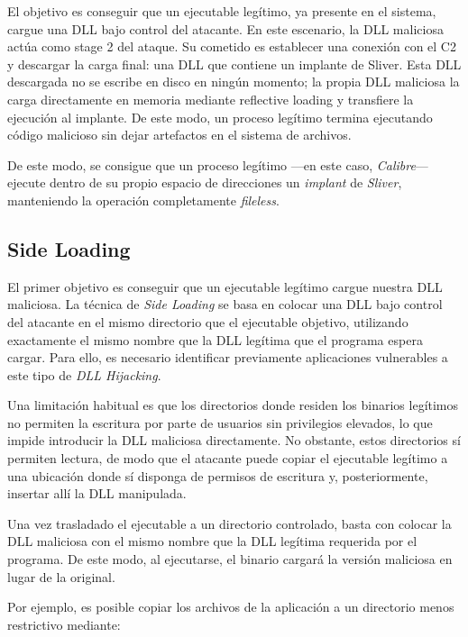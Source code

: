 El objetivo es conseguir que un ejecutable legítimo, ya presente en el sistema, cargue una DLL bajo control del atacante. En este escenario, la DLL maliciosa actúa como stage 2 del ataque. Su cometido es establecer una conexión con el C2 y descargar la carga final: una DLL que contiene un implante de Sliver. Esta DLL descargada no se escribe en disco en ningún momento; la propia DLL maliciosa la carga directamente en memoria mediante reflective loading y transfiere la ejecución al implante. De este modo, un proceso legítimo termina ejecutando código malicioso sin dejar artefactos en el sistema de archivos.

De este modo, se consigue que un proceso legítimo —en este caso, \textit{Calibre}— ejecute dentro de su propio espacio de direcciones un \textit{implant} de \textit{Sliver}, manteniendo la operación completamente \textit{fileless}.

\subsection{Side Loading}

El primer objetivo es conseguir que un ejecutable legítimo cargue nuestra DLL maliciosa. La técnica de \textit{Side Loading} se basa en colocar una DLL bajo control del atacante en el mismo directorio que el ejecutable objetivo, utilizando exactamente el mismo nombre que la DLL legítima que el programa espera cargar. Para ello, es necesario identificar previamente aplicaciones vulnerables a este tipo de \textit{DLL Hijacking}.

Una limitación habitual es que los directorios donde residen los binarios legítimos no permiten la escritura por parte de usuarios sin privilegios elevados, lo que impide introducir la DLL maliciosa directamente. No obstante, estos directorios sí permiten lectura, de modo que el atacante puede copiar el ejecutable legítimo a una ubicación donde sí disponga de permisos de escritura y, posteriormente, insertar allí la DLL manipulada.

Una vez trasladado el ejecutable a un directorio controlado, basta con colocar la DLL maliciosa con el mismo nombre que la DLL legítima requerida por el programa. De este modo, al ejecutarse, el binario cargará la versión maliciosa en lugar de la original.

Por ejemplo, es posible copiar los archivos de la aplicación a un directorio menos restrictivo mediante:


